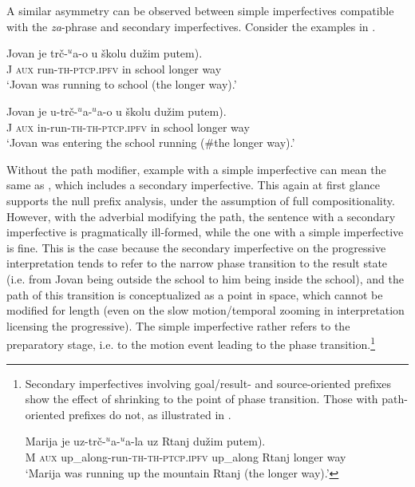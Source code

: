 \documentclass[output=paper]{langscibook}
\begin{document}
A similar asymmetry can be observed between simple imperfectives compatible with the \textit{za}-phrase and secondary imperfectives. Consider the examples in .

\ea\label{ars:ex:putem}
	\begin{xlist} 
		
\ex  \gll Jovan je trč-$^u$a-o u školu \minsp{(} dužim putem).\\
J \textsc{aux} run-\textsc{th-ptcp.ipfv} in school {} longer way\\
\glt `Jovan was running to school (the longer way).’\label{ars:ex:putema}

\ex  \gll Jovan je u-trč-$^u$a-$^u$a-o u školu \minsp{(\#} dužim	putem).\\
J \textsc{aux} in-run-\textsc{th-th-ptcp.ipfv} in school {} longer way\\
\glt `Jovan was entering the school running ($\#$the longer way).’\label{ars:ex:putemb}

	\end{xlist}
\z

\noindent Without the path modifier, example  with a simple imperfective can mean the same as , which includes a secondary imperfective. This again at first glance supports the null prefix analysis, under the assumption of full compositionality. However, with the adverbial modifying the path, the sentence with a secondary imperfective is pragmatically ill-formed, while the one with a simple imperfective is fine. This is the case because the secondary imperfective on the progressive interpretation tends to refer to the narrow phase transition to the result state (i.e. from Jovan being outside the school to him being inside the school), and the path of this transition is conceptualized as a point in space, which cannot be modified for length (even on the slow motion\slash temporal zooming in interpretation licensing the progressive). The simple imperfective rather refers to the preparatory stage, i.e. to the motion event leading to the phase transition.\footnote{Secondary imperfectives involving goal/result- and source-oriented prefixes show the effect of shrinking to the point of phase transition. Those with path-oriented prefixes do not, as illustrated in .

\ea\label{ars:ex:noshrink}

\gll Marija je uz-trč-$^u$a-$^u$a-la uz Rtanj \minsp{(} dužim	putem).\\
M \textsc{aux} up\_along-run-\textsc{th-th-ptcp.ipfv} up\_along Rtanj {} longer way\\
\glt `Marija was running up the mountain Rtanj (the longer way).’\label{ars:ex:noshrinka}

\z}
\end{document}
